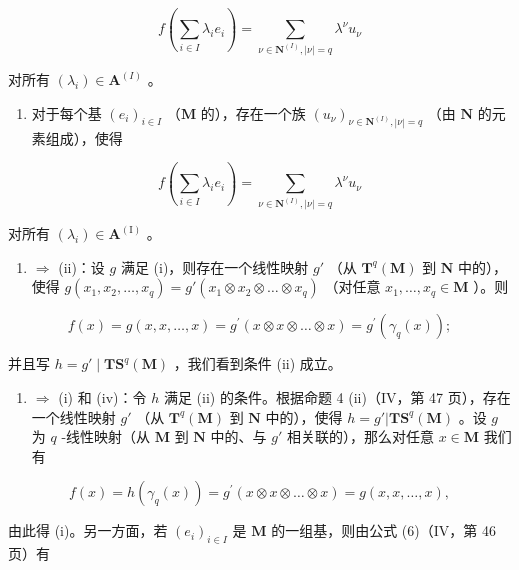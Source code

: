 \[
f \left(\sum_ {i \in I} \lambda_ {i} e _ {i}\right) = \sum_ {\nu \in \mathbf {N} ^ {(I)}, | \nu | = q} \lambda^ {\nu} u _ {\nu}\tag{15}
\]

对所有 \((\lambda_i) \in \mathbf{A}^{(I)}\) 。

\begin{enumerate}
\def\labelenumi{(\roman{enumi})}
\setcounter{enumi}{3}
\tightlist
\item
  对于每个基 \((e_i)_{i\in I}\) （\(\mathbf{M}\) 的），存在一个族 \((u_{\nu})_{\nu\in \mathbf{N}^{(I)},|\nu| = q}\) （由 \(\mathbf{N}\) 的元素组成），使得
\end{enumerate}

\[
f \left(\sum_ {i \in I} \lambda_ {i} e _ {i}\right) = \sum_ {\nu \in \mathbf {N} ^ {(I)}, | \nu | = q} \lambda^ {\nu} u _ {\nu}
\]

对所有 \((\lambda_i) \in \mathbf{A}^{(\mathrm{I})}\) 。

\begin{enumerate}
\def\labelenumi{(\roman{enumi})}
\tightlist
\item
  \(\Rightarrow\) (ii)：设 \(g\) 满足 (i)，则存在一个线性映射 \(g'\) （从 \(\mathbf{T}^q (\mathbf{M})\) 到 \(\mathbf{N}\) 中的），使得 \(g(x_{1},x_{2},\ldots ,x_{q}) = g'(x_{1}\otimes x_{2}\otimes \ldots \otimes x_{q})\) （对任意 \(x_{1},\ldots ,x_{q}\in \mathbf{M}\) ）。则
\end{enumerate}

\[
f (x) = g (x, x, \dots , x) = g ^ {\prime} (x \otimes x \otimes \dots \otimes x) = g ^ {\prime} (\gamma_ {q} (x));
\]

并且写 \(h = g' \mid \mathbf{TS}^q(\mathbf{M})\) ，我们看到条件 (ii) 成立。

\begin{enumerate}
\def\labelenumi{(\roman{enumi})}
\setcounter{enumi}{1}
\tightlist
\item
  \(\Rightarrow\) (i) 和 (iv)：令 \(h\) 满足 (ii) 的条件。根据命题 4 (ii)（IV，第 47 页），存在一个线性映射 \(g'\) （从 \(\mathbf{T}^q (\mathbf{M})\) 到 \(\mathbf{N}\) 中的），使得 \(h = g'|\mathbf{TS}^q (\mathbf{M})\) 。设 \(g\) 为 \(q\) -线性映射（从 \(\mathbf{M}\) 到 \(\mathbf{N}\) 中的、与 \(g'\) 相关联的），那么对任意 \(x\in \mathbf{M}\) 我们有
\end{enumerate}

\[
f (x) = h \left(\gamma_ {q} (x)\right) = g ^ {\prime} (x \otimes x \otimes \dots \otimes x) = g (x, x, \dots , x),
\]

由此得 (i)。另一方面，若 \((e_i)_{i\in I}\) 是 \(\mathbf{M}\) 的一组基，则由公式 (6)（IV，第 46 页）有

